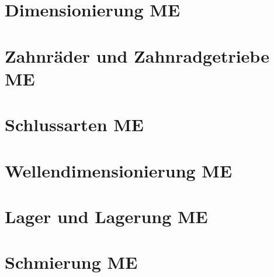 \documentclass[numerate]{cheatsheet}
\author{Nina Schmidt - nischmidt$@$ethz.ch}
\begin{document}
\renewcommand{\multirowsetup}{\centering} %
\setlength{\tabcolsep}{4pt}
\newcommand{\cbreak}{%
    \vfill\null\columnbreak%
}

\makeatletter
\newcommand{\pushright}[1]{\ifmeasuring@#1\else\omit\hfill$\displaystyle#1$\fi\ignorespaces}
\newcommand{\pushleft}[1]{\ifmeasuring@#1\else\omit$\displaystyle#1$\hfill\fi\ignorespaces}
\makeatother


\section{Dimensionierung \hfill ME}
    

\section{Zahnräder und Zahnradgetriebe \hfill ME}
    
    
    
    
    
    
    

\section{Schlussarten \hfill ME}
    
    
    

\section{Wellendimensionierung \hfill ME}
    
    
    

\section{Lager und Lagerung \hfill ME}
    
    \cbreak
    

\section{Schmierung \hfill ME}
    
\end{document}
